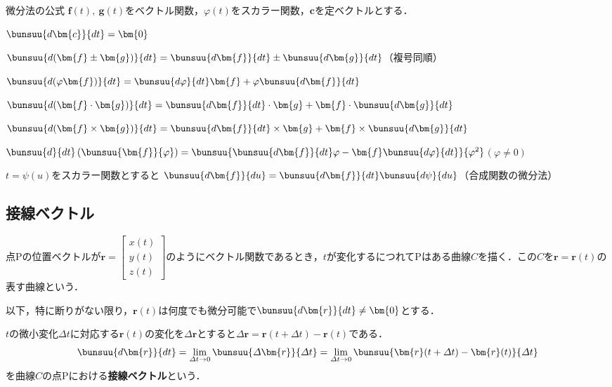 \begin{kousiki}{微分法の公式}
	$\bm{f}(t),\ \bm{g}(t)$をベクトル関数，$\varphi(t)$をスカラー関数，$\bm{c}$を定ベクトルとする．
	\begin{enumerate}[label=\textbf{[\arabic*]}, labelsep=10pt, leftmargin=23pt, itemsep=6pt]
		\item $\bunsuu{d\bm{c}}{dt} = \bm{0}$
		\item $\bunsuu{d(\bm{f} \pm \bm{g})}{dt} = \bunsuu{d\bm{f}}{dt} \pm \bunsuu{d\bm{g}}{dt}$\hfill（複号同順）
		\item $\bunsuu{d(\varphi\bm{f})}{dt} = \bunsuu{d\varphi}{dt}\bm{f} + \varphi\bunsuu{d\bm{f}}{dt}$
		\item $\bunsuu{d(\bm{f} \cdot \bm{g})}{dt} = \bunsuu{d\bm{f}}{dt} \cdot \bm{g} + \bm{f} \cdot \bunsuu{d\bm{g}}{dt}$
		\item $\bunsuu{d(\bm{f} \times \bm{g})}{dt} = \bunsuu{d\bm{f}}{dt} \times \bm{g} + \bm{f} \times \bunsuu{d\bm{g}}{dt}$
		\item $\bunsuu{d}{dt}\left(\bunsuu{\bm{f}}{\varphi}\right) = \bunsuu{\bunsuu{d\bm{f}}{dt}\varphi - \bm{f}\bunsuu{d\varphi}{dt}}{\varphi^2}$\qquad$(\varphi \ne 0)$
		\item $t = \psi(u)$をスカラー関数とすると \qquad $\bunsuu{d\bm{f}}{du} = \bunsuu{d\bm{f}}{dt}\bunsuu{d\psi}{du}$\hfill（合成関数の微分法）
	\end{enumerate}
\end{kousiki}



\subsection{接線ベクトル}

点$\mathrm{P}$の位置ベクトルが$\bm{r} =
\begin{bmatrix}
	x(t)\\ y(t)\\ z(t)
\end{bmatrix}
$のようにベクトル関数であるとき，$t$が変化するにつれて$\mathrm{P}$はある曲線$C$を描く．この$C$を$\bm{r} = \bm{r}(t)$の表す曲線という．

以下，特に断りがない限り，$\bm{r}(t)$は何度でも微分可能で$\bunsuu{d\bm{r}}{dt} \ne \bm{0}$とする．

$t$の微小変化$\varDelta t$に対応する$\bm{r}(t)$の変化を$\varDelta \bm{r}$とすると$\varDelta \bm{r} = \bm{r}(t + \varDelta t) - \bm{r}(t)$である．
\begin{equation}
	\bunsuu{d\bm{r}}{dt} = \lim_{\varDelta t \to 0} \bunsuu{\varDelta \bm{r}}{\varDelta t} = \lim_{\varDelta t \to 0} \bunsuu{\bm{r}(t + \varDelta t) - \bm{r}(t)}{\varDelta t}
\end{equation}
を曲線$C$の点$\mathrm{P}$における\textbf{接線ベクトル}という．

